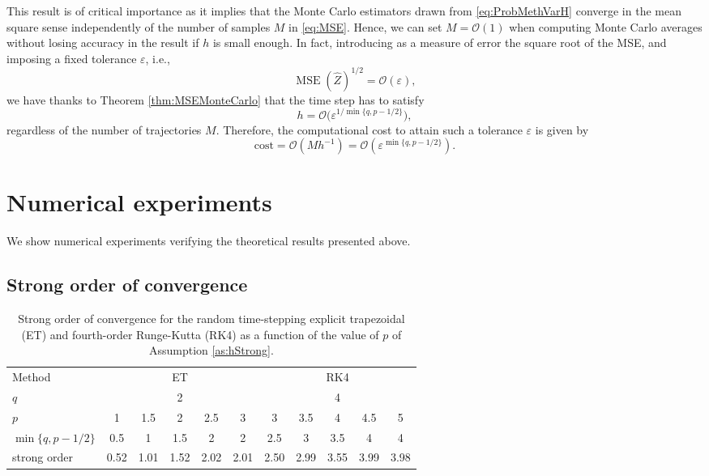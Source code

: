 \documentclass{siamart1116}
\numberwithin{theorem}{section}
\newcommand{\OO}{\mathcal{O}}
\newcommand{\epl}{\varepsilon}
\newcommand{\MSE}{\operatorname{MSE}}
\begin{document}
\begin{remark} This result is of critical importance as it implies that the Monte Carlo estimators drawn from \eqref{eq:ProbMethVarH} converge in the mean square sense independently of the number of samples $M$ in \eqref{eq:MSE}. Hence, we can set $M = \OO(1)$ when computing Monte Carlo averages without losing accuracy in the result if $h$ is small enough. In fact, introducing as a measure of error the square root of the MSE, and imposing a fixed tolerance $\epl$, i.e.,
\begin{equation}
	\MSE(\hat Z)^{1/2} = \OO(\epl),
\end{equation}
we have thanks to Theorem \ref{thm:MSEMonteCarlo} that the time step has to satisfy
\begin{equation}
	h = \OO\big(\epl^{1 / \min\{q, p - 1/2\}}\big),
\end{equation}
regardless of the number of trajectories $M$. Therefore, the computational cost to attain such a tolerance $\epl$ is given by
\begin{equation}
	\mathrm{cost} = \OO(Mh^{-1}) = \OO(\epl^{\min\{q, p - 1/2\}}).
\end{equation}
\end{remark} 

\section{Numerical experiments} 
We show numerical experiments verifying the theoretical results presented above.

\subsection{Strong order of convergence}

\begin{table}[!t]
	\centering
	\begin{tabular}{lcccccccccc}
		\toprule
		Method & \multicolumn{5}{c}{ET} & \multicolumn{5}{c}{RK4} \\ 
		\cmidrule(l{2pt}r{2pt}){2-6} \cmidrule(l{2pt}r{2pt}){7-11} 
		$q$ & \multicolumn{5}{c}{2} & \multicolumn{5}{c}{4} \\
		$p$ & 1 & 1.5 & 2 & 2.5 & 3 & 3 & 3.5 & 4 & 4.5 & 5\\
		$\min\{q, p - 1/2\}$ & 0.5 & 1 & 1.5 & 2 & 2 & 2.5 & 3 & 3.5 & 4 & 4 \\
		strong order & 0.52 & 1.01 & 1.52 & 2.02 & 2.01 & 2.50 & 2.99 & 3.55 & 3.99 & 3.98 \\
		\bottomrule
	\end{tabular}
	\caption{Strong order of convergence for the random time-stepping explicit trapezoidal (ET) and fourth-order Runge-Kutta (RK4) as a function of the value of $p$ of Assumption \ref{as:hStrong}.}
	\label{tab:NumericalResultsStrongOrder}
\end{table}
\end{document}
